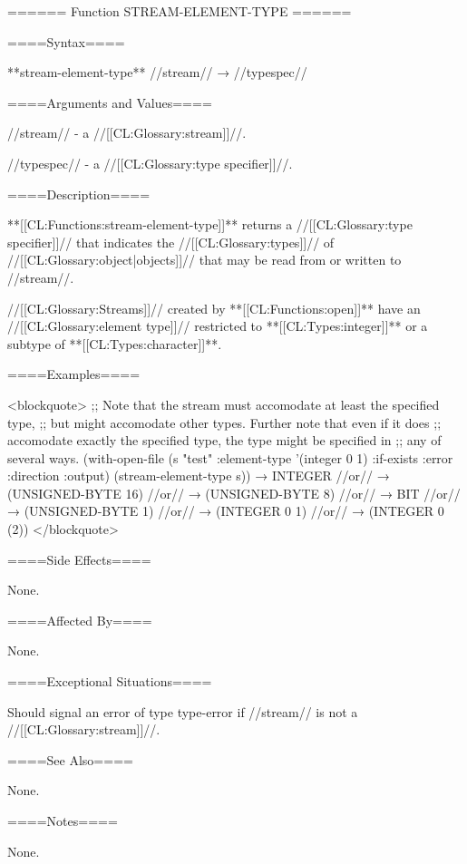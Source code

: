 ====== Function STREAM-ELEMENT-TYPE ======

====Syntax====

**stream-element-type** //stream// → //typespec//

====Arguments and Values====

//stream// - a //[[CL:Glossary:stream]]//.

//typespec// - a //[[CL:Glossary:type specifier]]//.

====Description====

**[[CL:Functions:stream-element-type]]** returns a //[[CL:Glossary:type specifier]]// that indicates the //[[CL:Glossary:types]]// of //[[CL:Glossary:object|objects]]// that may be read from or written to //stream//.

//[[CL:Glossary:Streams]]// created by **[[CL:Functions:open]]** have an //[[CL:Glossary:element type]]// restricted to **[[CL:Types:integer]]** or a subtype of **[[CL:Types:character]]**.

====Examples====

<blockquote> ;; Note that the stream must accomodate at least the specified type, ;; but might accomodate other types. Further note that even if it does ;; accomodate exactly the specified type, the type might be specified in ;; any of several ways. (with-open-file (s "test" :element-type '(integer 0 1) :if-exists :error :direction :output) (stream-element-type s)) → INTEGER //or// → (UNSIGNED-BYTE 16) //or// → (UNSIGNED-BYTE 8) //or// → BIT //or// → (UNSIGNED-BYTE 1) //or// → (INTEGER 0 1) //or// → (INTEGER 0 (2)) </blockquote>

====Side Effects====

None.

====Affected By====

None.

====Exceptional Situations====

Should signal an error of type type-error if //stream// is not a //[[CL:Glossary:stream]]//.

====See Also====

None.

====Notes====

None.

